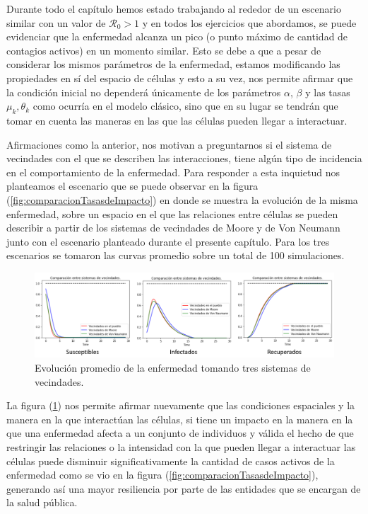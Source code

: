Durante todo el capítulo hemos estado trabajando al rededor de un escenario similar con un valor de $\mathcal{R}_0>1$ y en todos los ejercicios que abordamos, se puede evidenciar que la enfermedad alcanza un pico (o punto máximo de cantidad de contagios activos) en un momento similar. Esto se debe a que a pesar de considerar los mismos parámetros de la enfermedad, estamos modificando las propiedades en sí del espacio de células y esto a su vez, nos permite afirmar que la condición inicial no dependerá únicamente de los parámetros $\alpha$, $\beta$ y las tasas $\mu_k, \theta_k$ como ocurría en el modelo clásico, sino que en su lugar se tendrán que tomar en cuenta las maneras en las que las células pueden llegar a interactuar.

Afirmaciones como la anterior, nos motivan a preguntarnos si el sistema de vecindades con el que se describen las interacciones, tiene algún tipo de incidencia en el comportamiento de la enfermedad. Para responder a esta inquietud nos planteamos el escenario que se puede observar en la figura (\ref{fig:comparacionTasasdeImpacto}) en donde se muestra la evolución de la misma enfermedad, sobre un espacio en el que las relaciones entre células se pueden describir a partir de los sistemas de vecindades de Moore y de Von Neumann junto con el escenario planteado durante el presente capítulo. Para los tres escenarios se tomaron las curvas promedio sobre un total de 100 simulaciones.


\begin{figure}[h]
  \centering
    \includegraphics[width=1\textwidth]{Imagenes/comparacionSistemasVecindades.PNG}
    \caption{Evolución promedio de la enfermedad tomando tres sistemas de vecindades.}
    \label{fig:comparacionSistemasDeVecindades}
\end{figure}

La figura (\ref{fig:comparacionSistemasDeVecindades}) nos permite afirmar nuevamente que las condiciones espaciales y la manera en la que interactúan las células, si tiene un impacto en la manera en la que una enfermedad afecta a un conjunto de individuos y válida el hecho de que restringir las relaciones o la intensidad con la que pueden llegar a interactuar las células puede disminuir significativamente la cantidad de casos activos de la enfermedad como se vio en la figura (\ref{fig:comparacionTasasdeImpacto}), generando así una mayor resiliencia por parte de las entidades que se encargan de la salud pública.